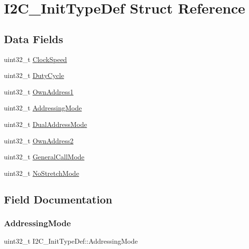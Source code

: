 \hypertarget{struct_i2_c___init_type_def}{}\section{I2\+C\+\_\+\+Init\+Type\+Def Struct Reference}
\label{struct_i2_c___init_type_def}
\subsection*{Data Fields}
\begin{DoxyCompactItemize}
\item 
uint32\+\_\+t \hyperlink{struct_i2_c___init_type_def_a45f1209e7e43e55f055bd9ead064230a}{Clock\+Speed}
\item 
uint32\+\_\+t \hyperlink{struct_i2_c___init_type_def_a91eb2f998ac771478ec0f44ac73c32dd}{Duty\+Cycle}
\item 
uint32\+\_\+t \hyperlink{struct_i2_c___init_type_def_abfb610317ea08e85c8feece82ccc9e16}{Own\+Address1}
\item 
uint32\+\_\+t \hyperlink{struct_i2_c___init_type_def_a5c39c41a5ee892c1bce69a579cc017ca}{Addressing\+Mode}
\item 
uint32\+\_\+t \hyperlink{struct_i2_c___init_type_def_add6a6b87ee067d33c94c554288736d40}{Dual\+Address\+Mode}
\item 
uint32\+\_\+t \hyperlink{struct_i2_c___init_type_def_a8165caf61b7b52f903edd7517ddaa06b}{Own\+Address2}
\item 
uint32\+\_\+t \hyperlink{struct_i2_c___init_type_def_a17ce92b135a4b5c045a5387c91677803}{General\+Call\+Mode}
\item 
uint32\+\_\+t \hyperlink{struct_i2_c___init_type_def_a28afdce458703464638f1a01e04da04e}{No\+Stretch\+Mode}
\end{DoxyCompactItemize}


\subsection{Field Documentation}
\mbox{\label{struct_i2_c___init_type_def_a5c39c41a5ee892c1bce69a579cc017ca}} 
\subsubsection{\texorpdfstring{Addressing\+Mode}{AddressingMode}}
{\footnotesize\ttfamily uint32\+\_\+t I2\+C\+\_\+\+Init\+Type\+Def\+::\+Addressing\+Mode}

